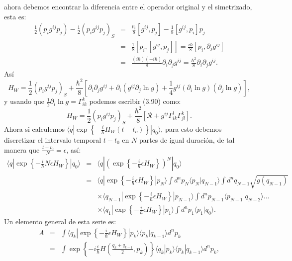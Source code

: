 ahora debemos encontrar la diferencia entre el operador original y el simetrizado, esta es:
\begin{eqnarray}
\nonumber \frac{1}{2}(p_{i}g^{ij}p_{j})-\frac{1}{2}(p_{i}g^{ij}p_{j})_{S}&=&\frac{p_{i}}{8}[g^{ij},p_{j}]-\frac{1}{8}[g^{ij},p_{i}]p_{j}\\
\nonumber &=& \frac{1}{8}[p_{i},[g^{ij},p_{j}]]=\frac{i\hbar}{8}[p_{i},\partial_{j}g^{ij}]\\
&=& \frac{(i\hbar)(-i\hbar)}{8}\partial_{i}\partial_{j}g^{ij}=\frac{\hbar^{2}}{8}\partial_{i}\partial_{j}g^{ij}.
\end{eqnarray}
Así
\begin{equation}
H_W= \frac{1}{2}(p_{i}g^{ij}p_{j})_{S}+\frac{\hbar^{2}}{8}[\partial_{i}\partial_{j}g^{ij}+\partial_{i}(g^{ij}\partial_{j}\ln g)+\frac{1}{4}g^{ij}(\partial_{i}\ln g)(\partial_{j}\ln g)],
\end{equation}
y usando que $\frac{1}{2}\partial_{i}\ln g=\Gamma_{ik}^{k}$ podemos escribir (3.90) como:
\begin{equation}
H_{W}=\frac{1}{2}(p_{i}g^{ij}p_{j})_{S}+\frac{\hbar^{2}}{8}[\mathcal{R}+g^{ij}\Gamma_{ik}^{l}\Gamma_{jl}^{k}].
\end{equation}
Ahora si calculemos $\langle q|\exp\left\{ -\frac{i}{\hbar}H_{W}(t-t_{o})\right\} |q_{0}\rangle $, para esto debemos discretizar el intervalo temporal $t-t_0$ en $N$ partes de igual duración, de tal manera que $\frac{t-t_0}{N}=\epsilon$, así:
\begin{eqnarray}
\nonumber \langle q|\exp\left\{ -\frac{i}{\hbar}N\epsilon H_{W}\right\} |q_{0}\rangle &=& \langle q|\left(\exp\left\{ -\frac{i}{\hbar}\epsilon H_{W}\right\} \right)^{N}|q_{0}\rangle\\
\nonumber &=& \langle q|\exp\left\{ -\frac{i}{\hbar}\epsilon H_{W}\right\} |p_{N}\rangle\int d^{n}p_{N}\langle p_{N}|q_{N-1}\rangle\int d^{n}q_{N-1}\sqrt{g(q_{N-1})}\\
 \nonumber &&\times \langle q_{N-1}|\exp\left\{ -\frac{i}{\hbar}\epsilon H_{W}\right\} |p_{N-1}\rangle\int d^{n}p_{N-1}\langle p_{N-1}|q_{N-2}\rangle...\\
 && \times \langle q_{1}|\exp\left\{ -\frac{i}{\hbar}\epsilon H_{W}\right\} |p_{1}\rangle\int d^{n}p_{1}\langle p_{1}|q_{0}\rangle.
\end{eqnarray}	
Un elemento general de esta serie es:
\begin{eqnarray}
\nonumber A&=& \int\langle q_{k}|\exp\left\{ -\frac{i}{\hbar}\epsilon H_{W}\right\} |p_{k}\rangle\langle p_{k}|q_{k-1}\rangle d^{n}p_{k}\\
&=& \int\exp\left\{ -i\frac{\epsilon}{\hbar}H\left(\frac{q_{k}+q_{k-1}}{2},p_{k}\right)\right\} \langle q_{k}|p_{k}\rangle\langle p_{k}|q_{k-1}\rangle d^{n}p_{k},
\end{eqnarray}
